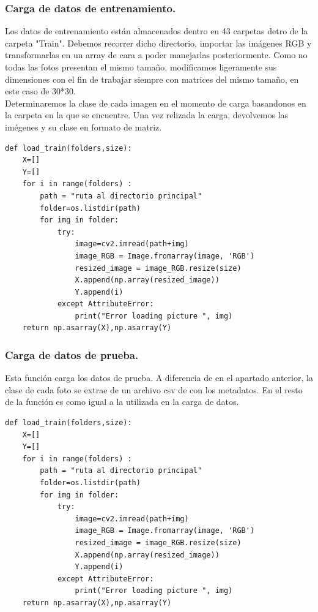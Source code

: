 \documentclass[a4paper,10pt]{article}
\begin{document}
\subsubsection{Carga de datos de entrenamiento.}
Los datos de entrenamiento están almacenados dentro en 43 carpetas detro de la carpeta "Train". Debemos recorrer dicho directorio, importar las imágenes RGB y transformarlas en un array de cara a poder manejarlas posteriormente. Como no todas las fotos presentan el mismo tamaño, modificamos ligeramente sus dimensiones con el fin de trabajar siempre con matrices del mismo tamaño, en este caso de 30*30.\\
Determinaremos la clase de cada imagen en el momento de carga basandonos en la carpeta en la que se encuentre. Una vez relizada la carga, devolvemos las imégenes y su clase en formato de matriz.
\begin{lstlisting}
def load_train(folders,size):
    X=[]
    Y=[]
    for i in range(folders) :
        path = "ruta al directorio principal"
        folder=os.listdir(path)
        for img in folder:
            try:
                image=cv2.imread(path+img)
                image_RGB = Image.fromarray(image, 'RGB')
                resized_image = image_RGB.resize(size)
                X.append(np.array(resized_image))
                Y.append(i)
            except AttributeError:
                print("Error loading picture ", img)
    return np.asarray(X),np.asarray(Y)
\end{lstlisting}
\subsubsection{Carga de datos de prueba.}
Esta función carga los datos de prueba. A diferencia de en el apartado anterior, la clase de cada foto se extrae de un archivo csv de con los metadatos. En el resto de la función es como igual a la utilizada en la carga de datos.

\begin{lstlisting}
def load_train(folders,size):
    X=[]
    Y=[]
    for i in range(folders) :
        path = "ruta al directorio principal"
        folder=os.listdir(path)
        for img in folder:
            try:
                image=cv2.imread(path+img)
                image_RGB = Image.fromarray(image, 'RGB')
                resized_image = image_RGB.resize(size)
                X.append(np.array(resized_image))
                Y.append(i)
            except AttributeError:
                print("Error loading picture ", img)
    return np.asarray(X),np.asarray(Y)
\end{lstlisting}
\end{document}
